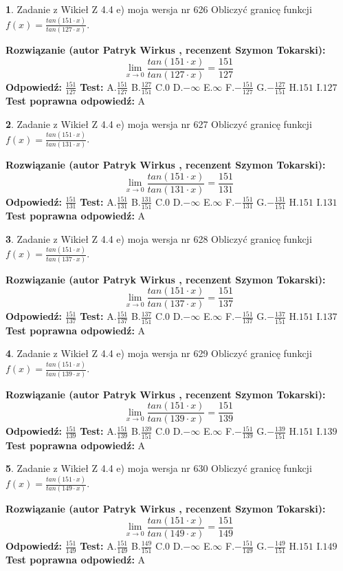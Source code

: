 \documentclass[12pt, a4paper]{article}
\theoremstyle{definition} %
\newtheorem{zad}{}
\newcommand{\zadStart}[1]{\begin{zad}#1\newline}
\newcommand{\zadStop}{\end{zad}}
\newcommand{\rozwStart}[2]{\noindent \textbf{Rozwiązanie (autor #1 , recenzent #2): }\newline}
\newcommand{\rozwStop}{\newline}
\newcommand{\odpStart}{\noindent \textbf{Odpowiedź:}\newline}
\newcommand{\odpStop}{\newline}
\newcommand{\testStart}{\noindent \textbf{Test:}\newline}
\newcommand{\testStop}{\newline}
\newcommand{\kluczStart}{\noindent \textbf{Test poprawna odpowiedź:}\newline}
\newcommand{\kluczStop}{\newline}
\begin{document}
\zadStart{Zadanie z Wikieł Z 4.4 e) moja wersja nr 626}
Obliczyć granicę funkcji $f(x)=\frac{tan(151\cdot x)}{tan(127\cdot x)}$.
\zadStop
\rozwStart{Patryk Wirkus}{Szymon Tokarski}
$$\lim\limits_{x\to 0}\frac{tan(151\cdot x)}{tan(127\cdot x)}=
\frac{151}{127}$$
\rozwStop
\odpStart
$\frac{151}{127}$
\odpStop
\testStart
A.$\frac{151}{127}$
B.$\frac{127}{151}$
C.$0$
D.$-\infty$
E.$\infty$
F.$-\frac{151}{127}$
G.$-\frac{127}{151}$
H.$151$
I.$127$
\testStop
\kluczStart
A
\kluczStop



\zadStart{Zadanie z Wikieł Z 4.4 e) moja wersja nr 627}
Obliczyć granicę funkcji $f(x)=\frac{tan(151\cdot x)}{tan(131\cdot x)}$.
\zadStop
\rozwStart{Patryk Wirkus}{Szymon Tokarski}
$$\lim\limits_{x\to 0}\frac{tan(151\cdot x)}{tan(131\cdot x)}=
\frac{151}{131}$$
\rozwStop
\odpStart
$\frac{151}{131}$
\odpStop
\testStart
A.$\frac{151}{131}$
B.$\frac{131}{151}$
C.$0$
D.$-\infty$
E.$\infty$
F.$-\frac{151}{131}$
G.$-\frac{131}{151}$
H.$151$
I.$131$
\testStop
\kluczStart
A
\kluczStop



\zadStart{Zadanie z Wikieł Z 4.4 e) moja wersja nr 628}
Obliczyć granicę funkcji $f(x)=\frac{tan(151\cdot x)}{tan(137\cdot x)}$.
\zadStop
\rozwStart{Patryk Wirkus}{Szymon Tokarski}
$$\lim\limits_{x\to 0}\frac{tan(151\cdot x)}{tan(137\cdot x)}=
\frac{151}{137}$$
\rozwStop
\odpStart
$\frac{151}{137}$
\odpStop
\testStart
A.$\frac{151}{137}$
B.$\frac{137}{151}$
C.$0$
D.$-\infty$
E.$\infty$
F.$-\frac{151}{137}$
G.$-\frac{137}{151}$
H.$151$
I.$137$
\testStop
\kluczStart
A
\kluczStop



\zadStart{Zadanie z Wikieł Z 4.4 e) moja wersja nr 629}
Obliczyć granicę funkcji $f(x)=\frac{tan(151\cdot x)}{tan(139\cdot x)}$.
\zadStop
\rozwStart{Patryk Wirkus}{Szymon Tokarski}
$$\lim\limits_{x\to 0}\frac{tan(151\cdot x)}{tan(139\cdot x)}=
\frac{151}{139}$$
\rozwStop
\odpStart
$\frac{151}{139}$
\odpStop
\testStart
A.$\frac{151}{139}$
B.$\frac{139}{151}$
C.$0$
D.$-\infty$
E.$\infty$
F.$-\frac{151}{139}$
G.$-\frac{139}{151}$
H.$151$
I.$139$
\testStop
\kluczStart
A
\kluczStop



\zadStart{Zadanie z Wikieł Z 4.4 e) moja wersja nr 630}
Obliczyć granicę funkcji $f(x)=\frac{tan(151\cdot x)}{tan(149\cdot x)}$.
\zadStop
\rozwStart{Patryk Wirkus}{Szymon Tokarski}
$$\lim\limits_{x\to 0}\frac{tan(151\cdot x)}{tan(149\cdot x)}=
\frac{151}{149}$$
\rozwStop
\odpStart
$\frac{151}{149}$
\odpStop
\testStart
A.$\frac{151}{149}$
B.$\frac{149}{151}$
C.$0$
D.$-\infty$
E.$\infty$
F.$-\frac{151}{149}$
G.$-\frac{149}{151}$
H.$151$
I.$149$
\testStop
\kluczStart
A
\kluczStop
\end{document}
